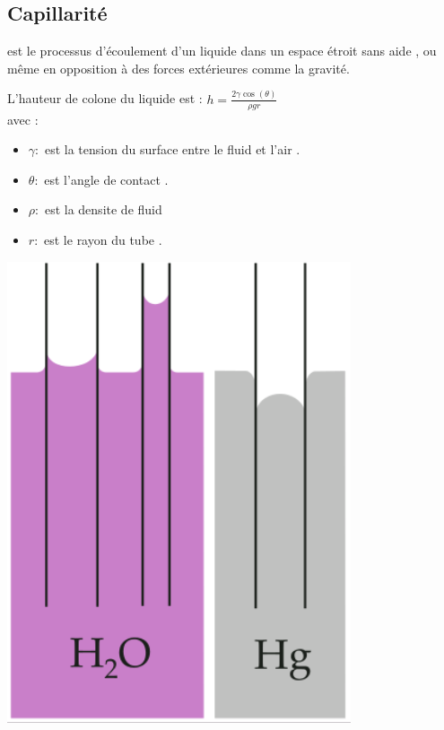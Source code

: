 \documentclass[12pt,oneside]{book}
\begin{document}
\subsection{Capillarité}
est le processus d'écoulement d'un liquide dans un espace étroit sans aide , ou même en opposition à des forces extérieures comme la gravité. \\
\begin{minipage}{0.7\linewidth}
	L'hauteur de colone du liquide est : $ h =\frac{2\gamma \cos(\theta)}{\rho g r} $ \\
	avec : \begin{itemize}
		\item $ \gamma :$ est la tension du surface entre le fluid et l'air .
		\item $ \theta : $ est l'angle de contact .
		\item $ \rho : $ est la densite de fluid
		\item $ r : $ est le rayon du tube .
	\end{itemize}
\end{minipage}
\begin{minipage}{0.3\linewidth}
	\includegraphics[width=\linewidth]{../pic/1103/5.png}
\end{minipage}
\end{document}

